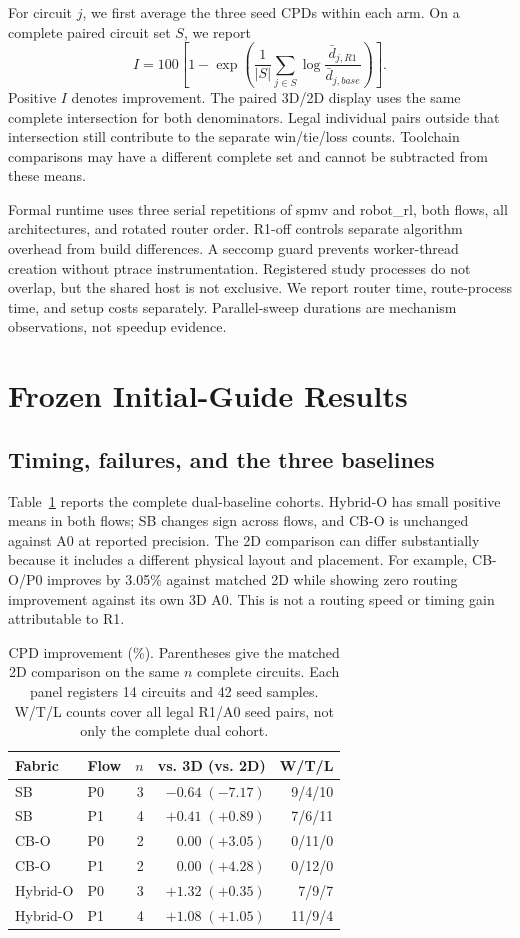 \documentclass[conference,10pt]{IEEEtran}
\begin{document}
For circuit $j$, we first average the three seed CPDs within each arm. On a complete paired circuit set $S$, we report
\begin{equation}
 I=100\left[1-\exp\left(\frac{1}{|S|}\sum_{j\in S}\log\frac{\bar d_{j,R1}}{\bar d_{j,base}}\right)\right].
\end{equation}
Positive $I$ denotes improvement. The paired 3D/2D display uses the same complete intersection for both denominators. Legal individual pairs outside that intersection still contribute to the separate win/tie/loss counts. Toolchain comparisons may have a different complete set and cannot be subtracted from these means.

Formal runtime uses three serial repetitions of spmv and robot\_rl, both flows, all architectures, and rotated router order. R1-off controls separate algorithm overhead from build differences. A seccomp guard prevents worker-thread creation without ptrace instrumentation. Registered study processes do not overlap, but the shared host is not exclusive. We report router time, route-process time, and setup costs separately. Parallel-sweep durations are mechanism observations, not speedup evidence.

\clearpage
\section{Frozen Initial-Guide Results}
\subsection{Timing, failures, and the three baselines}
Table~\ref{tab:main} reports the complete dual-baseline cohorts. Hybrid-O has small positive means in both flows; SB changes sign across flows, and CB-O is unchanged against A0 at reported precision. The 2D comparison can differ substantially because it includes a different physical layout and placement. For example, CB-O/P0 improves by 3.05\% against matched 2D while showing zero routing improvement against its own 3D A0. This is not a routing speed or timing gain attributable to R1.

\begin{table}[h]
\centering\caption{CPD improvement (\%). Parentheses give the matched 2D comparison on the same $n$ complete circuits. Each panel registers 14 circuits and 42 seed samples. W/T/L counts cover all legal R1/A0 seed pairs, not only the complete dual cohort.}
\label{tab:main}
\begin{tabular}{llrrr}\hline
Fabric & Flow & $n$ & vs. 3D (vs. 2D) & W/T/L\\\hline
SB & P0 &3&$-0.64\;(-7.17)$&9/4/10\\
SB & P1 &4&$+0.41\;(+0.89)$&7/6/11\\
CB-O & P0 &2&$0.00\;(+3.05)$&0/11/0\\
CB-O & P1 &2&$0.00\;(+4.28)$&0/12/0\\
Hybrid-O & P0 &3&$+1.32\;(+0.35)$&7/9/7\\
Hybrid-O & P1 &4&$+1.08\;(+1.05)$&11/9/4\\\hline
\end{tabular}
\end{table}
\end{document}
